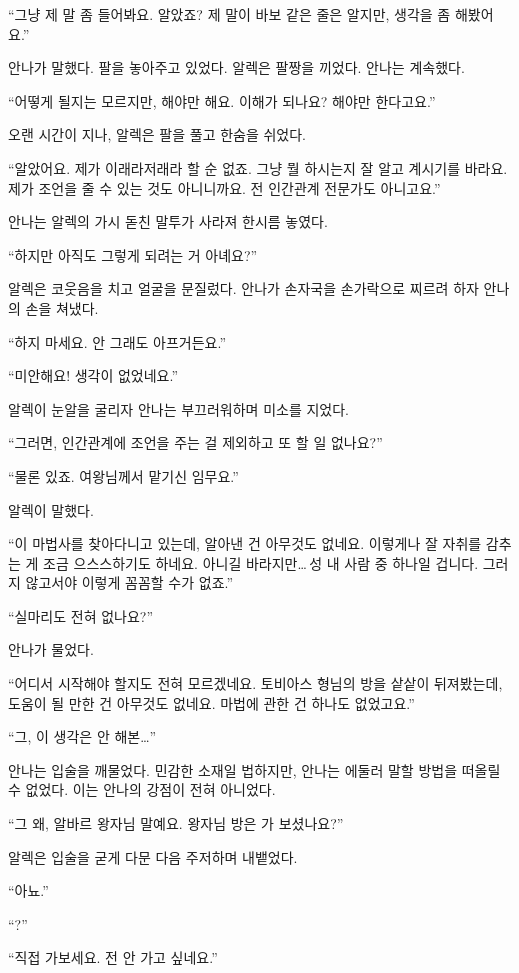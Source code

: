``그냥 제 말 좀 들어봐요. 알았죠? 제 말이 바보 같은 줄은 알지만, 생각을 좀 해봤어요.''

안나가 말했다. 팔을 놓아주고 있었다. 알렉은 팔짱을 끼었다. 안나는 계속했다.

``어떻게 될지는 모르지만, 해야만 해요. 이해가 되나요? 해야만 한다고요.''

오랜 시간이 지나, 알렉은 팔을 풀고 한숨을 쉬었다.

``알았어요. 제가 이래라저래라 할 순 없죠. 그냥 뭘 하시는지 잘 알고 계시기를 바라요. 제가 조언을 줄 수 있는 것도 아니니까요. 전 인간관계 전문가도 아니고요.''

안나는 알렉의 가시 돋친 말투가 사라져 한시름 놓였다.

``하지만 아직도 그렇게 되려는 거 아녜요?''

알렉은 코웃음을 치고 얼굴을 문질렀다. 안나가 손자국을 손가락으로 찌르려 하자 안나의 손을 쳐냈다.

``하지 마세요. 안 그래도 아프거든요.''

``미안해요! 생각이 없었네요.''

알렉이 눈알을 굴리자 안나는 부끄러워하며 미소를 지었다.

``그러면, 인간관계에 조언을 주는 걸 제외하고 또 할 일 없나요?''

``물론 있죠. 여왕님께서 맡기신 임무요.''

알렉이 말했다.

``이 마법사를 찾아다니고 있는데, 알아낸 건 아무것도 없네요. 이렇게나 잘 자취를 감추는 게 조금 으스스하기도 하네요. 아니길 바라지만\ldots\,성 내 사람 중 하나일 겁니다. 그러지 않고서야 이렇게 꼼꼼할 수가 없죠.''

``실마리도 전혀 없나요?''

안나가 물었다.

``어디서 시작해야 할지도 전혀 모르겠네요. 토비아스 형님의 방을 샅샅이 뒤져봤는데, 도움이 될 만한 건 아무것도 없네요. 마법에 관한 건 하나도 없었고요.''

``그, 이 생각은 안 해본\ldots''

안나는 입술을 깨물었다. 민감한 소재일 법하지만, 안나는 에둘러 말할 방법을 떠올릴 수 없었다. 이는 안나의 강점이 전혀 아니었다.

``그 왜, 알바르 왕자님 말예요. 왕자님 방은 가 보셨나요?''

알렉은 입술을 굳게 다문 다음 주저하며 내뱉었다.

``아뇨.''

``?''

``직접 가보세요. 전 안 가고 싶네요.''

